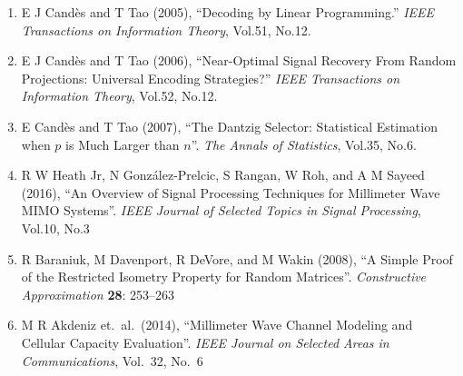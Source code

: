 \documentclass[12pt]{article}
\begin{document}
\begin{enumerate}
\item E J Cand\`es and T Tao (2005), ``Decoding by Linear Programming.'' \textit{IEEE Transactions on Information Theory}, Vol.51, No.12.

\item E J Cand\`es and T Tao (2006), ``Near-Optimal Signal Recovery From Random Projections: Universal Encoding Strategies?'' \textit{IEEE Transactions on Information Theory}, Vol.52, No.12.

\item E Cand\`es and T Tao (2007), ``The Dantzig Selector: Statistical Estimation when \(p\) is Much Larger than \(n\)''. \textit{The Annals of Statistics}, Vol.35, No.6.

\item R W Heath Jr, N González-Prelcic, S Rangan, W Roh, and A M Sayeed (2016), ``An Overview of Signal Processing Techniques for Millimeter Wave MIMO Systems''. \textit{IEEE Journal of Selected Topics in Signal Processing}, Vol.10, No.3

\item R Baraniuk, M Davenport, R DeVore, and M Wakin (2008), ``A Simple Proof of the Restricted Isometry Property for Random Matrices''. \textit{Constructive Approximation} \textbf{28}: 253–263

\item M R Akdeniz et.\ al.\ (2014), ``Millimeter Wave Channel Modeling and Cellular Capacity Evaluation''. \textit{IEEE Journal on Selected Areas in Communications}, Vol.\ 32, No.\ 6


\end{enumerate}
\end{document}
